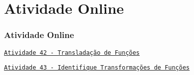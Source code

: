 \section{Atividade Online}
\begin{frame}
\frametitle{Atividade Online} 

\href{https://pt.khanacademy.org/math/algebra2/manipulating-functions/shifting-functions/e/shift-functions}
{{\tt Atividade 42 - Transladação de Funções}}

\href{https://pt.khanacademy.org/math/algebra2/manipulating-functions/stretching-functions/e/shifting_and_reflecting_functions}
{{\tt Atividade 43 - Identifique Transformações de Funções}}


\end{frame}

